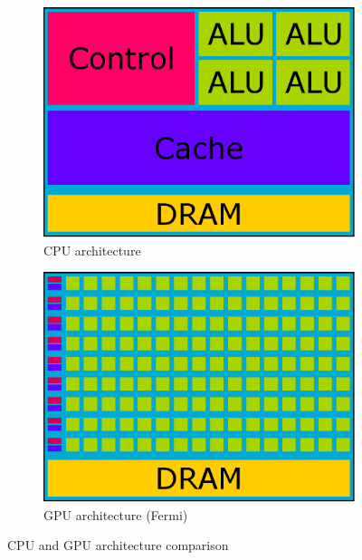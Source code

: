 \begin{description}
\begin{figure}[h]
\centering
\begin{subfigure}{.5\textwidth}
  \centering
  \includegraphics[width=.8\linewidth]{img/CPUarchitecture.eps}
  \caption{CPU architecture}
  \label{fig:cpuarchitecture}
\end{subfigure}%
\begin{subfigure}{.5\textwidth}
  \centering
  \includegraphics[width=.8\linewidth]{img/GPUarchitecture.eps}
  \caption{GPU architecture (Fermi)}
  \label{fig:gpuarchitecture}
\end{subfigure}%
\caption{CPU and GPU architecture comparison}
\end{figure}

\end{description}

